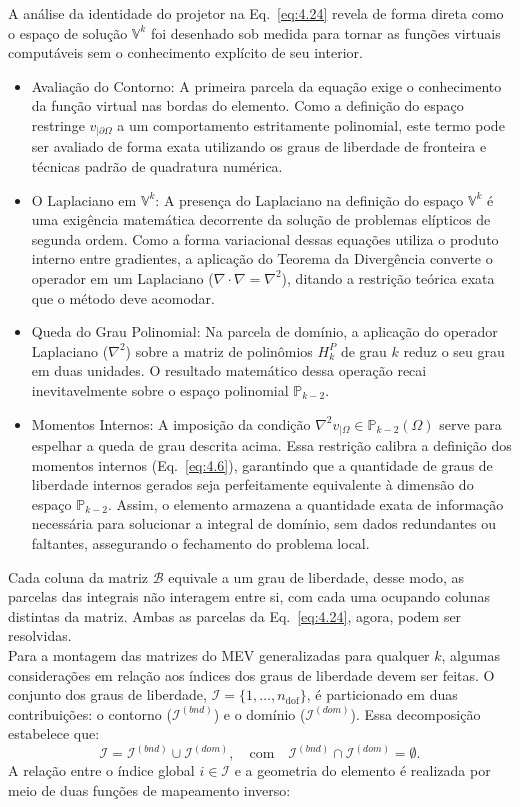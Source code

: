     \indent A análise da identidade do projetor na Eq.~\ref{eq:4.24} revela de forma direta como o espaço de solução $\mathbb{V}^k$ foi desenhado sob medida para tornar as funções virtuais computáveis sem o conhecimento explícito de seu interior.
    \begin{itemize}
        \item Avaliação do Contorno: A primeira parcela da equação exige o conhecimento da função virtual nas bordas do elemento. Como a definição do espaço restringe $v_{\vert{}\partial \Omega}$ a um comportamento estritamente polinomial, este termo pode ser avaliado de forma exata utilizando os graus de liberdade de fronteira e técnicas padrão de quadratura numérica.
        \item O Laplaciano em $\mathbb{V}^k$: A presença do Laplaciano na definição do espaço $\mathbb{V}^k$ é uma exigência matemática decorrente da solução de problemas elípticos de segunda ordem. Como a forma variacional dessas equações utiliza o produto interno entre gradientes, a aplicação do Teorema da Divergência converte o operador em um Laplaciano ($\nabla \cdot \nabla = \nabla^2$), ditando a restrição teórica exata que o método deve acomodar.
        \item Queda do Grau Polinomial: Na parcela de domínio, a aplicação do operador Laplaciano ($\nabla^2$) sobre a matriz de polinômios $H_k^P$ de grau $k$ reduz o seu grau em duas unidades. O resultado matemático dessa operação recai inevitavelmente sobre o espaço polinomial $\mathbb{P}_{k-2}$.
        \item Momentos Internos: A imposição da condição $\nabla^2 v_{\vert{}\Omega} \in \mathbb{P}_{k-2}(\Omega)$ serve para espelhar a queda de grau descrita acima. Essa restrição calibra a definição dos momentos internos (Eq.~\ref{eq:4.6}), garantindo que a quantidade de graus de liberdade internos gerados seja perfeitamente equivalente à dimensão do espaço $\mathbb{P}_{k-2}$. Assim, o elemento armazena a quantidade exata de informação necessária para solucionar a integral de domínio, sem dados redundantes ou faltantes, assegurando o fechamento do problema local.
    \end{itemize}
    \indent Cada coluna da matriz $\mathcal{B}$ equivale a um grau de liberdade, desse modo, as parcelas das integrais não interagem entre si, com cada uma ocupando colunas distintas da matriz. Ambas as parcelas da Eq.~\ref{eq:4.24}, agora, podem ser resolvidas.\\
    \indent Para a montagem das matrizes do MEV generalizadas para qualquer $k$, algumas considerações em relação aos índices dos graus de liberdade devem ser feitas. O conjunto dos graus de liberdade, $\mathcal{I} = \{1, \dots, n_{\mathrm{dof}}\}$, é particionado em duas contribuições: o contorno ($\mathcal{I}^{(bnd)}$) e o domínio ($\mathcal{I}^{(dom)}$). Essa decomposição estabelece que: $$\mathcal{I} = \mathcal{I}^{(bnd)} \cup \mathcal{I}^{(dom)}, \quad \text{com} \quad \mathcal{I}^{(bnd)} \cap \mathcal{I}^{(dom)} = \emptyset.$$ A relação entre o índice global $i \in \mathcal{I}$ e a geometria do elemento é realizada por meio de duas funções de mapeamento inverso:

